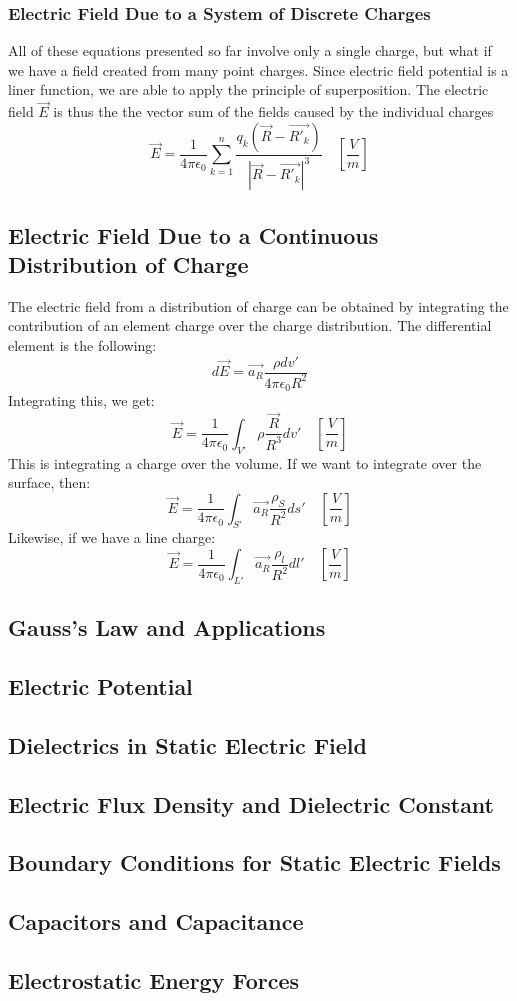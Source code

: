 \documentclass[11pt]{article}
\begin{document}
\subsubsection{Electric Field Due to a System of Discrete Charges}
All of these equations presented so far involve only a single charge, but what if we have a field created from many point charges. Since electric field potential is a liner function, we are able to apply the principle of superposition. The electric field $\vec{E}$ is thus the the vector sum of the fields caused by the individual charges
$$ \vec{E} = \frac{1}{4\pi\epsilon_0} \sum_{k=1}^{n} \frac{q_k (\vec{R} - \vec{R'_k})}{ |\vec{R} - \vec{R'_k}|^3} \quad \left[\frac{V}{m}\right]$$

\subsection{Electric Field Due to a Continuous Distribution of Charge}
The electric field from a distribution of charge can be obtained by integrating the contribution of an element charge over the charge distribution. The differential element is the following:
$$ d\vec{E} = \vec{a_R}\frac{\rho dv'}{4\pi \epsilon_0 R^2} $$
Integrating this, we get:
$$ \vec{E} = \frac{1}{4\pi\epsilon_0} \int_{V'} \rho \frac{\vec{R}}{R^3} dv' 	\quad	\left[\frac{V}{m}\right] $$
This is integrating a charge over the volume. If we want to integrate over the surface, then:
$$ \vec{E} = \frac{1}{4\pi\epsilon_0} \int_{S'} \vec{a_R}\frac{\rho_S}{R^2} ds'	\quad	 \left[\frac{V}{m}\right] $$
Likewise, if we have a line charge:
$$ \vec{E} = \frac{1}{4\pi\epsilon_0} \int_{L'} \vec{a_R}\frac{\rho_l}{R^2} dl'	\quad	 \left[\frac{V}{m}\right] $$
\subsection{Gauss's Law and Applications}

\subsection{Electric Potential}

\subsection{Dielectrics in Static Electric Field}

\subsection{Electric Flux Density and Dielectric Constant}

\subsection{Boundary Conditions for Static Electric Fields}

\subsection{Capacitors and Capacitance}

\subsection{Electrostatic Energy Forces}
\end{document}
